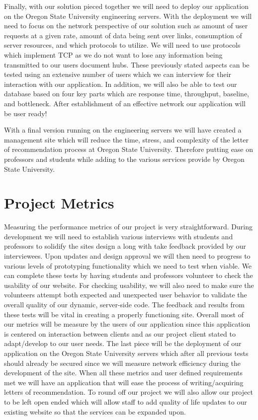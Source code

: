 \documentclass[onecolumn, draftclsnofoot,10pt, compsoc]{IEEEtran}
\begin{document}
Finally, with our solution pieced together we will need to deploy our application on the Oregon State University engineering servers. With the deployment we will need to focus on the network perspective of our solution such as amount of user requests at a given rate, amount of data being sent over links, consumption of server resources, and which protocols to utilize. We will need to use protocols which implement TCP as we do not want to lose any information being transmitted to our users document hubs. These previously stated aspects can be tested using an extensive number of users which we can interview for their interaction with our application. In addition, we will also be able to test our database based on four key parts which are response time, throughput, baseline, and bottleneck. After establishment of an effective network our application will be user ready! \vspace{4mm}

With a final version running on the engineering servers we will have created a management site which will reduce the time, stress, and complexity of the letter of recommendation process at Oregon State University. Therefore putting ease on professors and students while adding to the various services provide by Oregon State University. 


\center
\section*{Project Metrics}
\flushleft
Measuring the performance metrics of our project is very straightforward. During development we will need to establish various interviews with students and professors to solidify the sites design a long with take feedback provided by our interviewees. Upon updates and design approval we will then need to progress to various levels of prototyping functionality which we need to test when viable. We can complete these tests by having students and professors volunteer to check the usability of our website. For checking usability, we will also need to make sure the volunteers attempt both expected and unexpected user behavior to validate the overall quality of our dynamic, server-side code. The feedback and results from these tests will be vital in creating a properly functioning site. Overall most of our metrics will be measure by the users of our application since this application is centered on interaction between clients and as our project client stated to adapt/develop to our user needs. The last piece will be the deployment of our application on the Oregon State University servers which after all previous tests should already be secured since we will measure network efficiency during the development of the site. When all these metrics and user defined requirements met we will have an application that will ease the process of writing/acquiring letters of recommendation. To round off our project we will also allow our project to be left open ended which will allow staff to add quality of life updates to our existing website so that the services can be expanded upon.   
\end{document}

